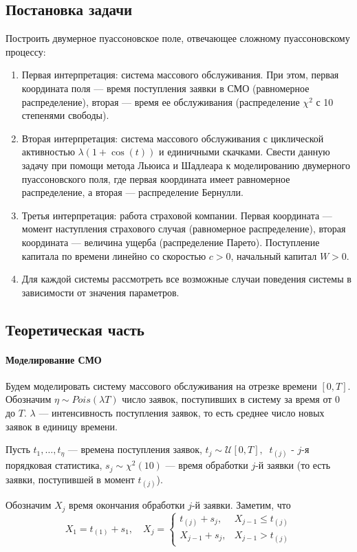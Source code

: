 \documentclass[16pt]{article}
\begin{document}
\subsection{Постановка задачи}
Построить двумерное пуассоновское поле, отвечающее сложному пуассоновскому процессу:
\begin{enumerate}
	\item Первая интерпретация: система массового обслуживания. При этом, первая координата поля --- время поступления заявки в СМО (равномерное распределение), вторая --- время ее обслуживания (распределение $\chi^2$ с 10 степенями свободы).
	\item Вторая интерпретация: система массового обслуживания с циклической активностью $\lambda(1 + \cos(t))$ и единичными скачками. Свести данную задачу при помощи метода Льюиса и Шадлеара к моделированию двумерного пуассоновского поля, где первая координата имеет равномерное распределение, а вторая --- распределение Бернулли.
	\item Третья интерпретация: работа страховой компании. Первая координата --- момент наступления страхового случая (равномерное распределение), вторая координата --- величина ущерба (распределение Парето). Поступление капитала по времени линейно со скоростью $c > 0$, начальный капитал $W > 0$.
	\item Для каждой системы рассмотреть все возможные случаи поведения системы в зависимости от значения параметров.
\end{enumerate}

\subsection{Теоретическая часть}
\paragraph{Моделирование СМО}
Будем моделировать систему массового обслуживания на отрезке времени $[0, T]$. Обозначим $\eta \sim Pois(\lambda T)$ число заявок, поступивших в систему за время от $0$ до $T$. $\lambda$ --- интенсивность поступления заявок, то есть среднее число новых заявок в единицу времени.

Пусть $t_1, \ldots, t_\eta$ --- времена поступления заявок, $t_j \sim \mathcal{U}[0, T],\ $ $t_{(j)}$ - $j$-я порядковая статистика, $s_j \sim \chi^2(10)$ --- время обработки $j$-й заявки (то есть заявки, поступившей в момент $t_{(j)}$).

Обозначим $X_j$ время окончания обработки $j$-й заявки. Заметим, что
$$X_1 = t_{(1)} + s_1, \quad 
X_j = \begin{cases}
t_{(j)} + s_j, & X_{j - 1} \leq t_{(j)} \\
X_{j-1} + s_j, & X_{j - 1} > t_{(j)}
\end{cases}
$$
\end{document}
